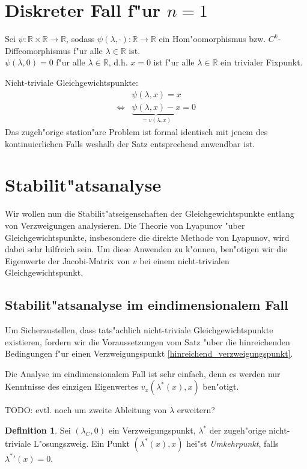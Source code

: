 \documentclass[a4paper, 13pt]{scrreprt}
\theoremstyle{definition} \newtheorem{definition}{Definition}[section]
\newcommand{\RR}{\mathbb{R}}
\begin{document}
\section{Diskreter Fall f"ur $n=1$}
Sei $\psi\colon\RR\times\RR\to\RR$, sodass $\psi(\lambda,\cdot)\colon\RR\to\RR$ ein Hom"oomorphismus bzw. $C^k$-Diffeomorphismus f"ur alle $\lambda \in \RR$ ist.
\\
$\psi(\lambda,0) = 0$ f"ur alle $\lambda\in\RR$, d.h. $x = 0$ ist f"ur alle $\lambda\in\RR$ ein trivialer Fixpunkt.

Nicht-triviale Gleichgewichtspunkte: 
\begin{align*}
&\psi(\lambda,x)=x\\
\Leftrightarrow &\underbrace{\psi(\lambda,x)-x}_{= v(\lambda,x)} = 0
\end{align*}
Das zugeh"orige station"are Problem ist formal identisch mit jenem des kontinuierlichen Falls weshalb der Satz entsprechend anwendbar ist.



\section{Stabilit"atsanalyse}
Wir wollen nun die Stabilit"atseigenschaften der Gleichgewichtspunkte entlang von Verzweigungen analysieren. Die Theorie von Lyapunov "uber Gleichgewichtspunkte, insbesondere die direkte Methode von Lyapunov, wird dabei sehr hilfreich sein. Um diese Anwenden zu k"onnen, ben"otigen wir die Eigenwerte der Jacobi-Matrix von $v$ bei einem nicht-trivialen Gleichgewichtspunkt.
\subsection{Stabilit"atsanalyse im eindimensionalem Fall}
Um Sicherzustellen, dass tats"achlich nicht-triviale Gleichgewichtspunkte existieren, fordern wir die Voraussetzungen vom Satz "uber die hinreichenden Bedingungen f"ur einen Verzweigungspunkt \eqref{hinreichend_verzweigungspunkt}.

Die Analyse im eindimensionalem Fall ist sehr einfach, denn es werden nur Kenntnisse des einzigen Eigenwertes $v_x(\lambda^*(x), x)$ ben"otigt. 

TODO: evtl. noch um zweite Ableitung von $\lambda$ erweitern?
\begin{definition}
Sei $(\lambda_C,0)$ ein Verzweigungspunkt, $\lambda^*$ der zugeh"orige nicht-triviale L"osungszweig. Ein Punkt $(\lambda^*(x), x)$ hei"st \emph{Umkehrpunkt}, falls ${\lambda^*}'(x) = 0$.
\end{definition}
\end{document}
